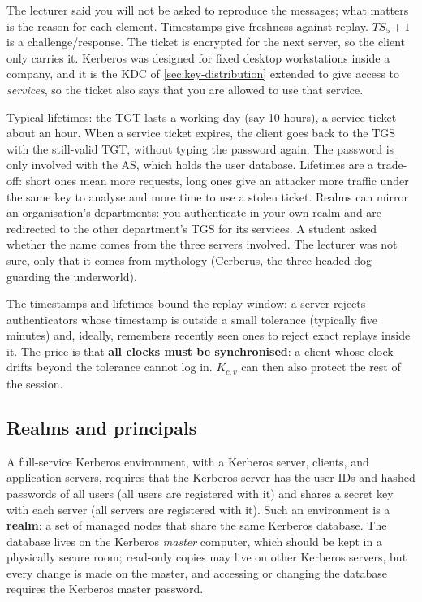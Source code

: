 \begin{remark}
The lecturer said you will not be asked to reproduce the messages; what matters is the reason for each element. Timestamps give freshness against replay. $TS_5 + 1$ is a challenge/response. The ticket is encrypted for the next server, so the client only carries it. Kerberos was designed for fixed desktop workstations inside a company, and it is the KDC of \cref{sec:key-distribution} extended to give access to \emph{services}, so the ticket also says that you are allowed to use that service.

Typical lifetimes: the TGT lasts a working day (say 10 hours), a service ticket about an hour. When a service ticket expires, the client goes back to the TGS with the still-valid TGT, without typing the password again. The password is only involved with the AS, which holds the user database. Lifetimes are a trade-off: short ones mean more requests, long ones give an attacker more traffic under the same key to analyse and more time to use a stolen ticket. Realms can mirror an organisation's departments: you authenticate in your own realm and are redirected to the other department's TGS for its services. A student asked whether the name comes from the three servers involved. The lecturer was not sure, only that it comes from mythology (Cerberus, the three-headed dog guarding the underworld).
\end{remark}

The timestamps and lifetimes bound the replay window: a server rejects authenticators whose timestamp is outside a small tolerance (typically five minutes) and, ideally, remembers recently seen ones to reject exact replays inside it. The price is that \textbf{all clocks must be synchronised}: a client whose clock drifts beyond the tolerance cannot log in. $K_{c,v}$ can then also protect the rest of the session.

\subsection{Realms and principals}

A full-service Kerberos environment, with a Kerberos server, clients, and application servers, requires that the Kerberos server has the user IDs and hashed passwords of all users (all users are registered with it) and shares a secret key with each server (all servers are registered with it). Such an environment is a \textbf{realm}: a set of managed nodes that share the same Kerberos database. The database lives on the Kerberos \emph{master} computer, which should be kept in a physically secure room; read-only copies may live on other Kerberos servers, but every change is made on the master, and accessing or changing the database requires the Kerberos master password.

